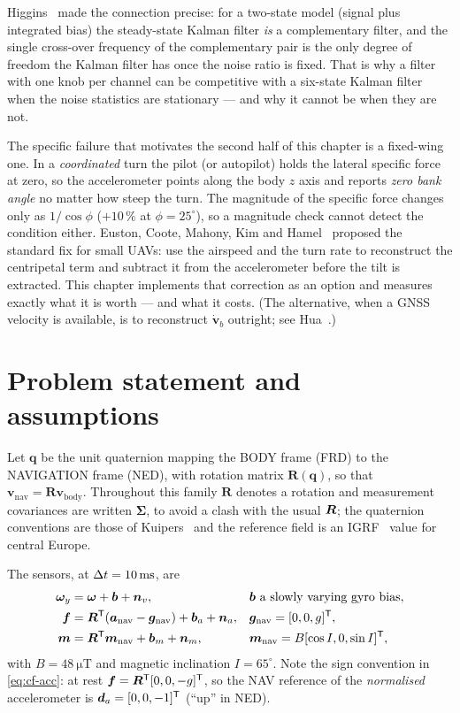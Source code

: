 Higgins~\cite{higgins1975complementary} made the connection precise: for a two-state model
(signal plus integrated bias) the steady-state Kalman filter \emph{is} a complementary filter, and
the single cross-over frequency of the complementary pair is the only degree of freedom the Kalman
filter has once the noise ratio is fixed. That is why a filter with one knob per channel can be
competitive with a six-state Kalman filter when the noise statistics are stationary --- and why it
cannot be when they are not.

The specific failure that motivates the second half of this chapter is a fixed-wing one. In a
\emph{coordinated} turn the pilot (or autopilot) holds the lateral specific force at zero, so the
accelerometer points along the body $z$ axis and reports \emph{zero bank angle} no matter how steep
the turn. The magnitude of the specific force changes only as $1/\cos\phi$ ($+10\,\%$ at
$\phi=25^\circ$), so a magnitude check cannot detect the condition either. Euston, Coote, Mahony,
Kim and Hamel~\cite{euston2008} proposed the standard fix for small UAVs: use the airspeed and the
turn rate to reconstruct the centripetal term and subtract it from the accelerometer before the
tilt is extracted. This chapter implements that correction as an option and measures exactly what
it is worth --- and what it costs. (The alternative, when a GNSS velocity is available, is to
reconstruct $\dot{\bm{v}}_b$ outright; see Hua~\cite{hua2010}.)

\section{Problem statement and assumptions}
Let $\bm{q}$ be the unit quaternion mapping the BODY frame (FRD) to the NAVIGATION frame (NED),
with rotation matrix $\bm{R}(\bm{q})$, so that $\bm{v}_{\text{nav}}=\bm{R}\bm{v}_{\text{body}}$.
Throughout this family $\bm{R}$ denotes a rotation and measurement covariances are written
$\bm{\Sigma}$, to avoid a clash with the usual $\bm{R}$; the quaternion conventions are those of
Kuipers~\cite{kuipers1999} and the reference field is an IGRF~\cite{thebault2015igrf} value for
central Europe.

The sensors, at $\Delta t=\SI{10}{\milli\second}$, are
\begin{align}
\bm{\omega}_y &= \bm{\omega} + \bm{b} + \bm{n}_v, &&\bm{b} \text{ a slowly varying gyro bias},\label{eq:cf-gyro}\\
\bm{f} &= \bm{R}^{\mathsf{T}}(\bm{a}_{\text{nav}} - \bm{g}_{\text{nav}}) + \bm{b}_a + \bm{n}_a, &&\bm{g}_{\text{nav}} = [0,0,g]^{\mathsf{T}},\label{eq:cf-acc}\\
\bm{m} &= \bm{R}^{\mathsf{T}}\bm{m}_{\text{nav}} + \bm{b}_m + \bm{n}_m, &&\bm{m}_{\text{nav}} = B[\cos I,0,\sin I]^{\mathsf{T}},\label{eq:cf-mag}
\end{align}
with $B=\SI{48}{\micro\tesla}$ and magnetic inclination $I=65^\circ$. Note the sign convention in
\eqref{eq:cf-acc}: at rest $\bm{f}=\bm{R}^{\mathsf{T}}[0,0,-g]^{\mathsf{T}}$, so the NAV reference of the
\emph{normalised} accelerometer is $\bm{d}_a=[0,0,-1]^{\mathsf{T}}$ (``up'' in NED).

